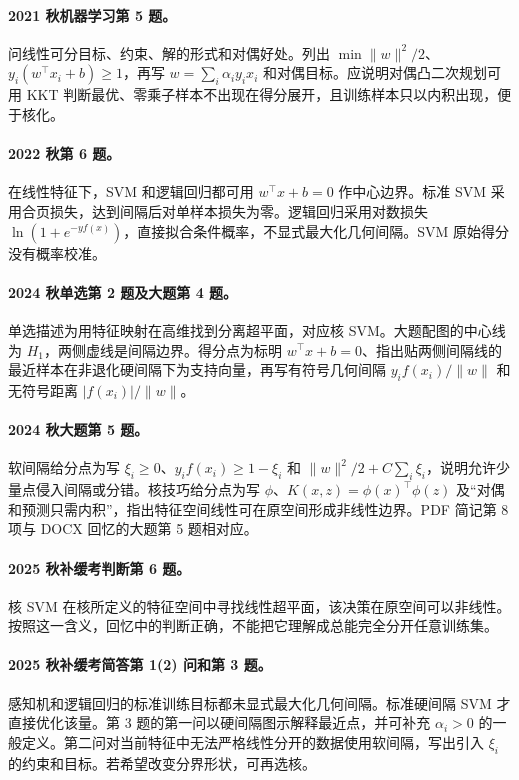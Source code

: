 \documentclass[UTF8,a4paper,zihao=-4,fontset=fandol]{ctexrep}
\begin{document}
\paragraph{2021 秋机器学习第 5 题。} 问线性可分目标、约束、解的形式和对偶好处。列出 $\min\|w\|^2/2$、$y_i(w^\top x_i+b)\ge1$，再写 $w=\sum_i\alpha_i y_ix_i$ 和对偶目标。应说明对偶凸二次规划可用 KKT 判断最优、零乘子样本不出现在得分展开，且训练样本只以内积出现，便于核化。
\paragraph{2022 秋第 6 题。} 在线性特征下，SVM 和逻辑回归都可用 $w^\top x+b=0$ 作中心边界。标准 SVM 采用合页损失，达到间隔后对单样本损失为零。逻辑回归采用对数损失 $\ln(1+e^{-y f(x)})$，直接拟合条件概率，不显式最大化几何间隔。SVM 原始得分没有概率校准。
\paragraph{2024 秋单选第 2 题及大题第 4 题。} 单选描述为用特征映射在高维找到分离超平面，对应核 SVM。大题配图的中心线为 $H_1$，两侧虚线是间隔边界。得分点为标明 $w^\top x+b=0$、指出贴两侧间隔线的最近样本在非退化硬间隔下为支持向量，再写有符号几何间隔 $y_if(x_i)/\|w\|$ 和无符号距离 $|f(x_i)|/\|w\|$。
\paragraph{2024 秋大题第 5 题。} 软间隔给分点为写 $\xi_i\ge0$、$y_if(x_i)\ge1-\xi_i$ 和 $\|w\|^2/2+C\sum_i\xi_i$，说明允许少量点侵入间隔或分错。核技巧给分点为写 $\phi$、$K(x,z)=\phi(x)^\top\phi(z)$ 及“对偶和预测只需内积”，指出特征空间线性可在原空间形成非线性边界。PDF 简记第 8 项与 DOCX 回忆的大题第 5 题相对应。
\paragraph{2025 秋补缓考判断第 6 题。} 核 SVM 在核所定义的特征空间中寻找线性超平面，该决策在原空间可以非线性。按照这一含义，回忆中的判断正确，不能把它理解成总能完全分开任意训练集。
\paragraph{2025 秋补缓考简答第 1(2) 问和第 3 题。} 感知机和逻辑回归的标准训练目标都未显式最大化几何间隔。标准硬间隔 SVM 才直接优化该量。第 3 题的第一问以硬间隔图示解释最近点，并可补充 $\alpha_i>0$ 的一般定义。第二问对当前特征中无法严格线性分开的数据使用软间隔，写出引入 $\xi_i$ 的约束和目标。若希望改变分界形状，可再选核。
\end{document}
